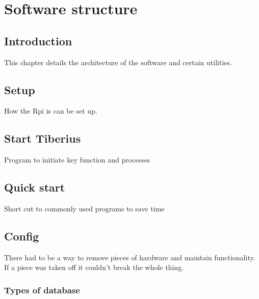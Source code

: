 \section{Software structure}
\pagestyle{aidan}

\subsection{Introduction}
This chapter details the architecture of the software and certain utilities.

\subsection{Setup}
How the Rpi is can be set up.

\subsection{Start Tiberius}
Program to initiate key function and processes

\subsection{Quick start}
Short cut to commonly used programs to save time



\subsection{Config}
There had to be a way to remove pieces of hardware and maintain functionality. If a piece was taken off it couldn't break the whole thing.


\subsubsection{Types of database}





